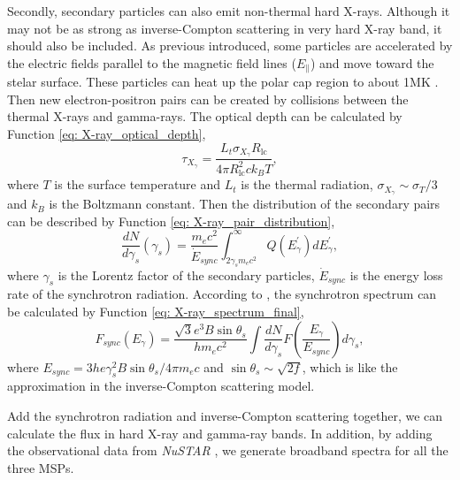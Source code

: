 \documentclass[a4paper, 12pt]{report}
\begin{document}
    Secondly, secondary particles can also emit non-thermal hard X-rays. Although it may 
    not be as strong as inverse-Compton scattering in very hard X-ray band, it should also 
    be included. As previous introduced, some particles are accelerated by the electric 
    fields parallel to the magnetic field lines ($E_{\parallel}$) and move toward the 
    stelar surface. These particles can heat up the polar cap region to about 1MK
    \cite{0004-637X-745-1-100}. Then new electron-positron pairs can be created by collisions
    between the thermal X-rays and gamma-rays. The optical depth can be calculated by 
    Function \ref{eq: X-ray_optical_depth}, 
    \begin{equation}
      \label{eq: X-ray_optical_depth}
      \tau_{X_{\gamma}} = \frac{L_{t} \sigma_{X_{\gamma}} R_{\text{lc}}}{4\pi R_{\text{lc}}^2 ck_{B}T} ,
    \end{equation}
    where $T$ is the surface temperature and
    $L_{t}$ is the thermal radiation, $\sigma_{X_{\gamma}} \sim \sigma_T / 3$ and 
    $k_B$ is the Boltzmann constant. Then the distribution of the secondary pairs can be 
    described by Function \ref{eq: X-ray_pair_distribution},
    \begin{equation}
      \label{eq: X-ray_pair_distribution}
      \frac{dN}{d\gamma_s} \left(\gamma_s\right) = \frac{m_e c^2}{\dot{E}_{sync}}\int_{2\gamma_s m_e c^2}^{\infty} Q\left(E_{\gamma}^{\prime}\right) dE_{\gamma}^{\prime} ,
    \end{equation}
    where $\gamma_s$ is the Lorentz
    factor of the secondary particles, $\dot{E}_{sync}$ is the energy loss rate of the 
    synchrotron radiation. According to \cite{0004-637X-787-2-167}, the synchrotron 
    spectrum can be calculated by Function \ref{eq: X-ray_spectrum_final},
    \begin{equation}
      \label{eq: X-ray_spectrum_final}
      F_{sync}\left(E_{\gamma}\right) = \frac{\sqrt{3}e^3B \sin{\theta_s}}{h m_e c^2} \int\frac{dN}{d\gamma_s} F\left(\frac{E_{\gamma}}{E_{sync}}\right)d\gamma_s ,
    \end{equation}
    where $E_{sync} = 3he\gamma_s^2B \sin{\theta_s}/4\pi m_e c$ and 
    $\sin{\theta_s}\sim\sqrt{2f}$, which is like the approximation in the inverse-Compton 
    scattering model.

    Add the synchrotron radiation and inverse-Compton scattering together, we can calculate
    the flux in hard X-ray and gamma-ray bands. In addition, by adding the observational data
    from \textit{NuSTAR} \cite{0004-637X-845-2-159}, we generate broadband spectra for all
    the three MSPs.
\end{document}
